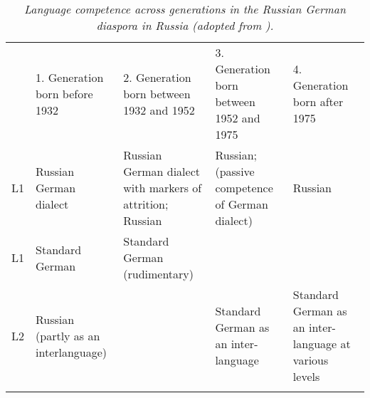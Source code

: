 \begin{table}
\begin{small}
\begin{tabular}{l p{7.2em}<{\raggedright}p{7.2em}<{\raggedright}p{7.2em}<{\raggedright}p{7.2em}<{\raggedright}}
	\midrule
	    \addlinespace[2mm]
			& 1. Generation born before 1932 & 2. Generation born between 1932 and 1952 & 3. Generation born between 1952 and 1975 & 4. Generation born after 1975 \\ \addlinespace[2mm] 	\midrule
			\addlinespace[2mm]
		L1 & Russian German dialect	& Russian German dialect with markers of attrition; Russian	& Russian; (passive competence of German dialect) 	& Russian\\
		\addlinespace[2mm]
		L1 & Standard German	& Standard German (rudimentary)	& 	& \\
		\addlinespace[2mm]
		L2 & Russian (partly as an interlanguage)	& 	& Standard German as an inter- language 	& Standard German as an inter- language at various levels\\
		\addlinespace[2mm]
		\midrule
\end{tabular}
\end{small}
\caption{\textit{Language competence across generations in the Russian German diaspora in Russia (adopted from \citealt{riehlTA}).}}\label{tab:3:2}
\end{table}

